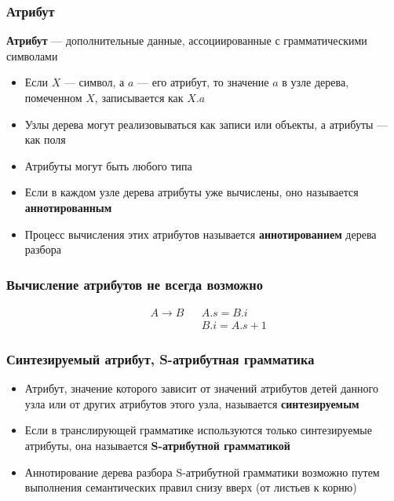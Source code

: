 \documentclass{beamer}
\begin{document}
\begin{frame}[fragile]
  \transwipe[direction=90]
  \frametitle{Атрибут}

\begin{center}
    \textbf{Атрибут} --- дополнительные данные, ассоциированные с грамматическими символами
\end{center}
  \begin{itemize}
    \item Если $X$ --- символ, а $a$ --- его атрибут, то значение $a$ в узле дерева, помеченном $X$, записывается как $X.a$
    \item Узлы дерева могут реализовываться как записи или объекты, а атрибуты --- как поля
    \item Атрибуты могут быть любого типа 
    \item Если в каждом узле дерева атрибуты уже вычислены, оно называется \textbf{аннотированным}
    \item Процесс вычисления этих атрибутов называется \textbf{аннотированием} дерева разбора
  \end{itemize}
\end{frame}

\begin{frame}[fragile]
  \transwipe[direction=90]
  \frametitle{Вычисление атрибутов не всегда возможно}
$$
\begin{array}{clcl}
&A \rightarrow    B   & & A.s = B.i \\
&                     & & B.i = A.s + 1 
\end{array}
$$  
\end{frame}


\begin{frame}[fragile]
  \transwipe[direction=90]
  \frametitle{Синтезируемый атрибут, S-атрибутная грамматика}
  \begin{itemize}
    \item Атрибут, значение которого зависит от значений атрибутов детей данного узла или от других атрибутов этого узла, называется \textbf{синтезируемым}
    \item Если в транслирующей грамматике используются только синтезируемые атрибуты, она называется \textbf{S-атрибутной грамматикой}
    \item Аннотирование дерева разбора S-атрибутной грамматики возможно путем выполнения семантических правил снизу вверх (от листьев к корню)
  \end{itemize}    
  
\end{frame}
\end{document}
